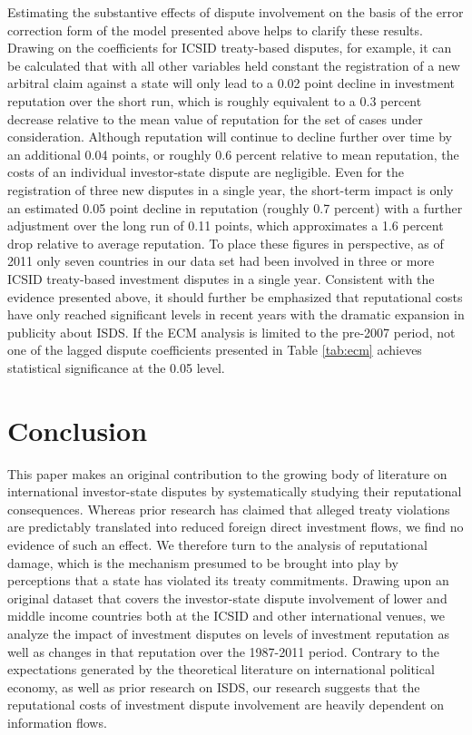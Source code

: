 \documentclass[12pt,onesided]{amsart}
\begin{document}

Estimating the substantive effects of dispute involvement on the basis of the error correction form of the model presented above helps to clarify these results. Drawing on the coefficients for ICSID treaty-based disputes, for example, it can be calculated that with all other variables held constant the registration of a new arbitral claim against a state will only lead to a 0.02 point decline in investment reputation over the short run, which is roughly equivalent to a 0.3 percent decrease relative to the mean value of reputation for the set of cases under consideration. Although reputation will continue to decline further over time by an additional 0.04 points, or roughly 0.6 percent relative to mean reputation, the costs of an individual investor-state dispute are negligible. Even for the registration of three new disputes in a single year, the short-term impact is only an estimated 0.05 point decline in reputation (roughly 0.7 percent) with a further adjustment over the long run of 0.11 points, which approximates a 1.6 percent drop relative to average reputation. To place these figures in perspective, as of 2011 only seven countries in our data set had been involved in three or more ICSID treaty-based investment disputes in a single year. Consistent with the evidence presented above, it should further be emphasized that reputational costs have only reached significant levels in recent years with the dramatic expansion in publicity about ISDS. If the ECM analysis is limited to the pre-2007 period, not one of the lagged dispute coefficients presented in Table \ref{tab:ecm} achieves statistical significance at the 0.05 level. 

\section*{Conclusion}

This paper makes an original contribution to the growing body of literature on international investor-state disputes by systematically studying their reputational consequences. Whereas prior research has claimed that alleged treaty violations are predictably translated into reduced foreign direct investment flows, we find no evidence of such an effect. We therefore turn to the analysis of reputational damage, which is the mechanism presumed to be brought into play by perceptions that a state has violated its treaty commitments. Drawing upon an original dataset that covers the investor-state dispute involvement of lower and middle income countries both at the ICSID and other international venues, we analyze the impact of investment disputes on levels of investment reputation as well as changes in that reputation over the 1987-2011 period. Contrary to the expectations generated by the theoretical literature on international political economy, as well as prior research on ISDS, our research suggests that the reputational costs of investment dispute involvement are heavily dependent on information flows. 
\end{document}
